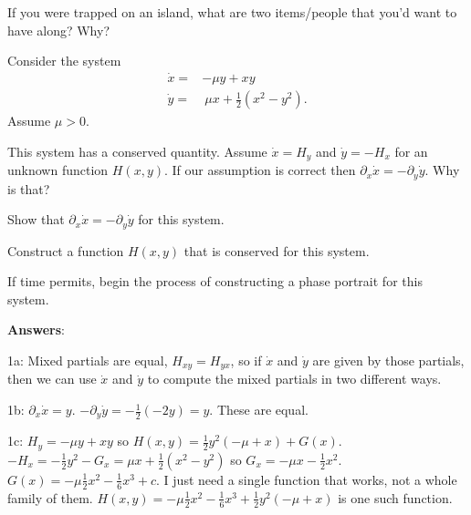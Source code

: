 \documentclass[12pt,letterpaper,noanswers]{exam}
\begin{document}
\begin{questions}
\setcounter{question}{-1}
\item If you were trapped on an island, what are two items/people that you'd want to have along?  Why?

\item  Consider the system 
 \begin{align*}
 \dot{x} = & - \mu y + x y   \\
 \dot{y} = &\ \mu x + \frac{1}{2}(x^2 - y^2).
 \end{align*}
 Assume $\mu > 0$.
 
 \begin{parts}
 \item This system has a conserved quantity.  Assume $\dot x = H_y$ and $\dot y = -H_x$ for an unknown function $H(x,y)$.  If our assumption is correct then $\partial_x\dot x = -\partial_y \dot y$.  Why is that?
 \item Show that $\partial_x\dot x = -\partial_y \dot y$ for this system.
 \item Construct a function $H(x,y)$ that is conserved for this system.
 \item If time permits, begin the process of constructing a phase portrait for this system.
 \end{parts}
\end{questions}

\eject
\textbf{Answers}: 

1a: Mixed partials are equal, $H_{xy} = H_{yx}$, so if $\dot x$ and $\dot y$ are given by those partials, then we can use $\dot x$ and $\dot y$ to compute the mixed partials in two different ways.

1b: $\partial_x\dot x = y$.  $-\partial_y\dot y = -\frac{1}{2}(-2y) = y$.  These are equal.

1c: $H_y = -\mu y + xy$ so $H(x,y) = \frac{1}{2}y^2(-\mu + x) + G(x)$.  $-H_x = -\frac{1}{2}y^2 - G_x =\mu x + \frac{1}{2}(x^2 - y^2)$ so $G_x = -\mu x - \frac{1}{2}x^2$.  $G(x) = -\mu\frac{1}{2}x^2 - \frac{1}{6}x^3 + c$.  I just need a single function that works, not a whole family of them.  $H(x,y) = -\mu\frac{1}{2}x^2 - \frac{1}{6}x^3+\frac{1}{2}y^2(-\mu + x) $ is one such function.
\end{document}

